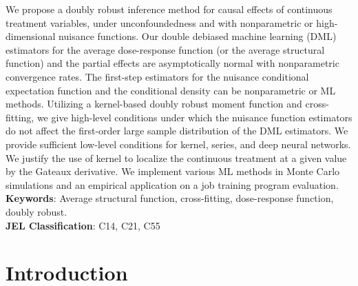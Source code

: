 \documentclass[lettersize, 12pt]{article}
\begin{document}
\vspace{-10pt}


We propose a doubly robust inference method for causal effects of continuous treatment variables, under unconfoundedness and with nonparametric or high-dimensional nuisance functions.  Our double debiased machine learning (DML) estimators for the average dose-response function (or the average structural function) and the partial effects are asymptotically normal with nonparametric convergence rates.  The first-step estimators for the nuisance conditional expectation function and the conditional density can be nonparametric or ML methods.  Utilizing a kernel-based doubly robust moment function and cross-fitting, we give high-level conditions under which the nuisance function estimators do not affect the first-order large sample distribution of the DML estimators.  We  provide sufficient low-level conditions for kernel, series, and deep neural networks.  We justify the use of kernel to localize the continuous treatment at a given value by the Gateaux derivative.  We implement various ML methods in Monte Carlo simulations and an empirical application on a job training program evaluation. 
\\
\textbf{Keywords}: Average structural function, cross-fitting, dose-response function, doubly robust.
\\
\textbf{JEL Classification}: C14, C21, C55
%

\newpage
\section{Introduction}
\end{document}
